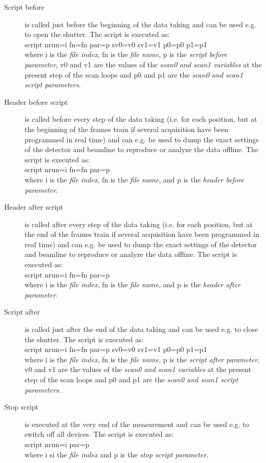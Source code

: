 \begin{description}
\item[Script before]
  is called just before the beginning of the data taking and can be used e.g. to open the shutter.
  The script is executed as:\\
  script nrun=i fn=fn par=p sv0=v0 sv1=v1 p0=p0 p1=p1 \\
  where i is the  \textit{file index}, fn is the \textit{file name}, p is the \textit{script before parameter}, v0 and v1 are the  values of the \textit{scan0 and scan1 variables} at the present step of the scan loops and  p0 and p1 are the \textit{scan0 and scan1 script parameters}.
  

\item[Header before script]
    is called before every step of the data taking (i.e. for each position, but at the beginning of the frames train if several acquisition have been programmed in real time) and can e.g. be used to dump the exact settings of the detector and beamline to reproduce or analyze the data offline.
    The script is executed as:\\
    script nrun=i fn=fn par=p\\
    where i is the  \textit{file index}, fn is the \textit{file name}, and p is the \textit{header before parameter}.

\item[Header after script]
    is called after every step of the data taking (i.e. for each position, but at the end of the frames train if several acquisition have been programmed in real time) and can e.g. be used to dump the exact settings of the detector and beamline to reproduce or analyze the data offline.
    The script is executed as:\\
    script nrun=i fn=fn par=p\\
    where i is the  \textit{file index}, fn is the \textit{file name}, and p is the \textit{header after parameter}.

\item[Script after] 
  is called just after the end of the data taking and can be used e.g. to close the shutter.
  The script is executed as:\\
  script nrun=i fn=fn par=p sv0=v0 sv1=v1 p0=p0 p1=p1 \\
  where i is the  \textit{file index}, fn is the \textit{file name}, p is the \textit{script after parameter}, v0 and v1 are the  values of the \textit{scan0 and scan1 variables} at the present step of the scan loops and  p0 and p1 are the \textit{scan0 and scan1 script parameters}.
  
\item[Stop script]
     is executed at the very end of the measurement and can be used e.g. to switch off all devices. The script is executed as:\\
      script  nrun=i par=p\\
      where i si the \textit{file index} and p is the \textit{stop script parameter}.

\end{description}






